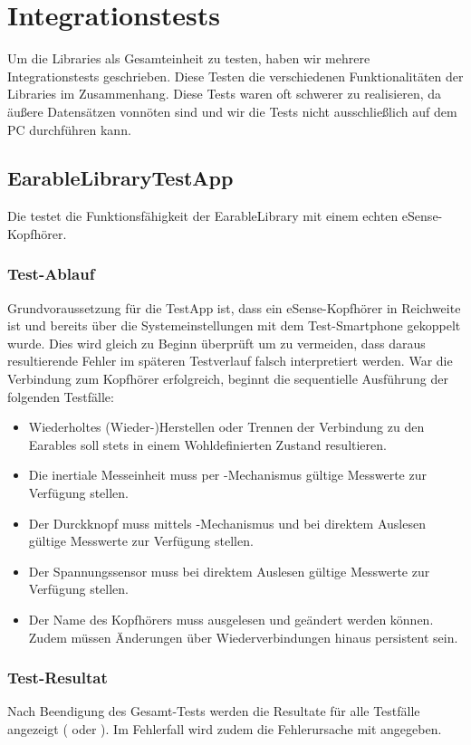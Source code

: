 \documentclass[../implementierung.tex]{subfiles}
\begin{document}
\section{Integrationstests}

Um die Libraries als Gesamteinheit zu testen, haben wir mehrere Integrationstests geschrieben. Diese Testen die verschiedenen Funktionalitäten der Libraries im Zusammenhang. Diese Tests waren oft schwerer zu realisieren, da äußere Datensätzen vonnöten sind und wir die Tests nicht ausschließlich auf dem PC durchführen kann.

\subsection{EarableLibraryTestApp}

	Die  testet die Funktionsfähigkeit der EarableLibrary mit einem echten eSense-Kopfhörer.

	\subsubsection{Test-Ablauf}
		Grundvoraussetzung für die TestApp ist, dass ein eSense-Kopfhörer in Reichweite ist und bereits über die Systemeinstellungen mit dem Test-Smartphone gekoppelt wurde.
		Dies wird gleich zu Beginn überprüft um zu vermeiden, dass daraus resultierende Fehler im späteren Testverlauf falsch interpretiert werden.
		War die Verbindung zum Kopfhörer erfolgreich, beginnt die sequentielle Ausführung der folgenden Testfälle:
		\begin{itemize}
			\item {} Wiederholtes (Wieder-)Herstellen oder Trennen der Verbindung zu den Earables soll stets in einem Wohldefinierten Zustand resultieren.
			\item {} Die inertiale Messeinheit muss per -Mechanismus gültige Messwerte zur Verfügung stellen.
			\item {} Der Durckknopf muss mittels -Mechanismus und bei direktem Auslesen gültige Messwerte zur Verfügung stellen.
			\item {} Der Spannungssensor muss bei direktem Auslesen gültige Messwerte zur Verfügung stellen.
			\item {} Der Name des Kopfhörers muss ausgelesen und geändert werden können. Zudem müssen Änderungen über Wiederverbindungen hinaus persistent sein.
		\end{itemize}

	\subsubsection{Test-Resultat}
		Nach Beendigung des Gesamt-Tests werden die Resultate für alle Testfälle angezeigt ( oder ).
		Im Fehlerfall wird zudem die Fehlerursache mit angegeben.
\end{document}
